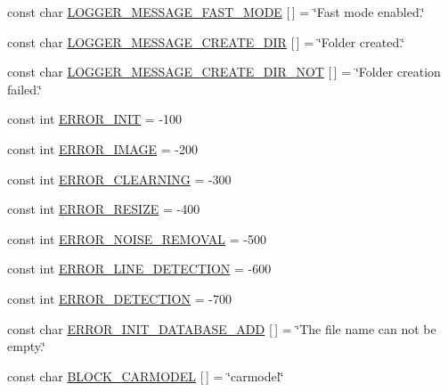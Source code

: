 \begin{DoxyCompactItemize}
\item 
const char \mbox{\hyperlink{namespaceyenot_a23d265aa1784a96ebe7ce76bedd308a6}{L\+O\+G\+G\+E\+R\+\_\+\+M\+E\+S\+S\+A\+G\+E\+\_\+\+F\+A\+S\+T\+\_\+\+M\+O\+DE}} \mbox{[}$\,$\mbox{]} = \char`\"{}Fast mode enabled.\char`\"{}
\item 
const char \mbox{\hyperlink{namespaceyenot_ace626bb1b7477b39cf2864aa0d0924e9}{L\+O\+G\+G\+E\+R\+\_\+\+M\+E\+S\+S\+A\+G\+E\+\_\+\+C\+R\+E\+A\+T\+E\+\_\+\+D\+IR}} \mbox{[}$\,$\mbox{]} = \char`\"{}Folder created.\char`\"{}
\item 
const char \mbox{\hyperlink{namespaceyenot_ae73ee066dad5c6455cb406ab3aa0473f}{L\+O\+G\+G\+E\+R\+\_\+\+M\+E\+S\+S\+A\+G\+E\+\_\+\+C\+R\+E\+A\+T\+E\+\_\+\+D\+I\+R\+\_\+\+N\+OT}} \mbox{[}$\,$\mbox{]} = \char`\"{}Folder creation failed.\char`\"{}
\item 
const int \mbox{\hyperlink{namespaceyenot_a8206ed93e65c9e89395c2823a5f18786}{E\+R\+R\+O\+R\+\_\+\+I\+N\+IT}} = -\/100
\item 
const int \mbox{\hyperlink{namespaceyenot_a3c1c146cfa3fc68ce0e1950b93270849}{E\+R\+R\+O\+R\+\_\+\+I\+M\+A\+GE}} = -\/200
\item 
const int \mbox{\hyperlink{namespaceyenot_a9b11e5890ebee4b3ace81f058483b7af}{E\+R\+R\+O\+R\+\_\+\+C\+L\+E\+A\+R\+N\+I\+NG}} = -\/300
\item 
const int \mbox{\hyperlink{namespaceyenot_a787166b1304265d12d6ff10b175a66bc}{E\+R\+R\+O\+R\+\_\+\+R\+E\+S\+I\+ZE}} = -\/400
\item 
const int \mbox{\hyperlink{namespaceyenot_a0699d20f9a904f7faf8b63cc7fc31c63}{E\+R\+R\+O\+R\+\_\+\+N\+O\+I\+S\+E\+\_\+\+R\+E\+M\+O\+V\+AL}} = -\/500
\item 
const int \mbox{\hyperlink{namespaceyenot_ab63291c5dfdea5865dc7a32401095215}{E\+R\+R\+O\+R\+\_\+\+L\+I\+N\+E\+\_\+\+D\+E\+T\+E\+C\+T\+I\+ON}} = -\/600
\item 
const int \mbox{\hyperlink{namespaceyenot_af6dc289a999d852dd3da0134f47cda0f}{E\+R\+R\+O\+R\+\_\+\+D\+E\+T\+E\+C\+T\+I\+ON}} = -\/700
\item 
const char \mbox{\hyperlink{namespaceyenot_af958287fcf5b41e632a87bd1a795c74b}{E\+R\+R\+O\+R\+\_\+\+I\+N\+I\+T\+\_\+\+D\+A\+T\+A\+B\+A\+S\+E\+\_\+\+A\+DD}} \mbox{[}$\,$\mbox{]} = \char`\"{}The file name can not be empty.\char`\"{}
\item 
const char \mbox{\hyperlink{namespaceyenot_a3c950090a29f01a39ec562e1e30452b9}{B\+L\+O\+C\+K\+\_\+\+C\+A\+R\+M\+O\+D\+EL}} \mbox{[}$\,$\mbox{]} = \char`\"{}carmodel\char`\"{}
\item 

\end{DoxyCompactItemize}
